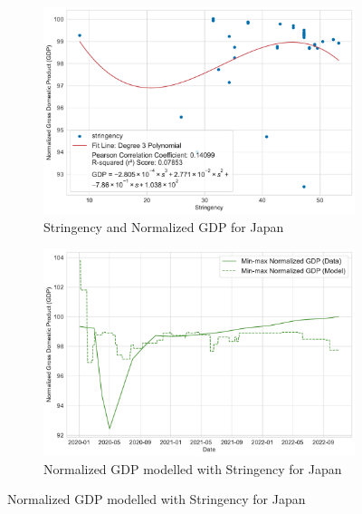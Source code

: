 \documentclass[tikz,fleqn,12pt]{wlscirep}
\begin{document}
\begin{figure}[htbp!]
  \begin{subfigure}[t]{0.48\textwidth}
    \centering
    \includegraphics[width=\linewidth]{images/stringency_vs_gdp_JPN.pdf}
    \caption{Stringency and Normalized GDP for Japan}
  \end{subfigure}
  \label{fig:stringency_vs_gdp_JPN}
  \hfill
  \begin{subfigure}[t]{0.48\textwidth}
    \centering
    \includegraphics[width=\linewidth]{images/gdp_modelled_with_stringency_JPN.pdf}
    \caption{Normalized GDP modelled with Stringency for Japan}
  \end{subfigure}
  \label{fig:gdp_modelled_with_stringency_JPN}


\end{figure}
\end{document}
